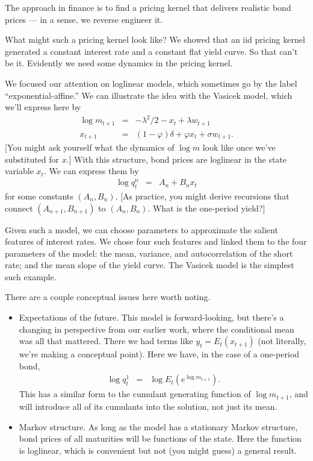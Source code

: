 \documentclass[11pt]{article}
\begin{document}
The approach in finance is to find a pricing kernel
that delivers realistic bond prices --- in a sense, we reverse
engineer it.

What might such a pricing kernel look like?
We showed that an iid pricing kernel generated a constant interest rate
and a constant flat yield curve.
So that can't be it.
Evidently we need some dynamics in the pricing kernel.


We focused our attention on loglinear models,
which sometimes go by the label ``exponential-affine.''
We can illustrate the idea with the Vasicek model,
which we'll express here by
\begin{eqnarray*}
    \log m_{t+1} &=& - \lambda^2/2 - x_t + \lambda w_{t+1} \\
         x_{t+1} &=& (1-\varphi) \delta + \varphi x_t + \sigma w_{t+1} .
\end{eqnarray*}
[You might ask yourself what the dynamics of $\log m$ look like once
we've substituted for $x$.]
With this structure, bond prices are loglinear in the state variable $x_t$.
We can express them by
\begin{eqnarray*}
    \log q^n_t &=& A_n + B_n x_t
\end{eqnarray*}
for some constants $(A_n,B_n)$.
[As practice, you might derive recursions that connect
$(A_{n+1},B_{n+1})$ to $(A_n,B_n)$.
What is the one-period yield?]


Given such a model, we can choose parameters to approximate the
salient features of interest rates.
We chose four such features and linked them to the four parameters
of the model:
the mean, variance, and autocorrelation of the short rate;
and the mean slope of the yield curve.
The Vasicek model is the simplest such example.

There are a couple conceptual issues here worth noting.
\begin{itemize}
\item Expectations of the future.
This model is forward-looking, but there's a changing in perspective from our earlier work,
where the conditional mean was all that mattered.
There we had terms like
$y_t = E_t (x_{t+1}) $
(not literally, we're making a conceptual point).
Here we have, in the case of a one-period bond,
\begin{eqnarray*}
    \log q^1_t &=& \log E_t \left( e^{\log m_{t+1}} \right) .
\end{eqnarray*}
This has a similar form to the cumulant generating function of $\log m_{t+1}$,
and will introduce all of its cumulants into the solution,
not just its mean.
\item Markov structure.
As long as the model has a stationary Markov structure,
bond prices of all maturities will be functions of the state.
Here the function is loglinear, which is convenient
but not (you might guess) a general result.
\end{itemize}
\end{document}
